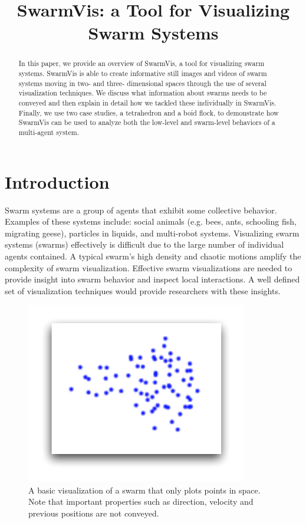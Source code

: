 \documentclass[conference]{IEEEtran}
\begin{document}
\title{SwarmVis: a Tool for Visualizing Swarm Systems}

\author{
\and
{}
}
\maketitle


\begin{abstract}
In this paper, we provide an overview of SwarmVis, a tool for visualizing swarm systems. SwarmVis is able to create informative still images and videos of swarm systems moving in two- and three- dimensional spaces through the use of several visualization techniques. We discuss what information about swarms needs to be conveyed and then explain in detail how we tackled these individually in SwarmVis. Finally, we use two case studies, a tetrahedron and a boid flock, to demonstrate how SwarmVis can be used to analyze both the low-level and swarm-level behaviors of a multi-agent system.


\end{abstract}

\section{Introduction}
Swarm systems are a group of agents that exhibit some collective behavior. Examples of these systems include: social animals (e.g. bees, ants, schooling fish, migrating geese), particles in liquids,  and multi-robot systems. Visualizing swarm systems (swarms) effectively is difficult due to the large number of individual agents contained. A typical swarm's high density and chaotic motions amplify the complexity of swarm visualization. Effective swarm visualizations are needed to provide insight into swarm behavior and inspect local interactions.
A well defined set of visualization techniques would provide researchers with these insights.

\begin{figure}[ht]
\centering
\includegraphics[scale=1]{images/basic.pdf}
\caption{A basic visualization of a swarm that only plots points in space. Note that important properties such as direction, velocity
and previous positions are not conveyed.}
\label{old}
\end{figure}
\end{document}
